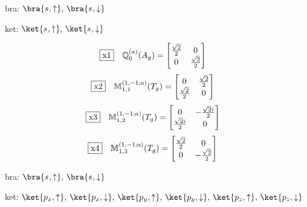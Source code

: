 \documentclass[fleqn,10pt,landscape]{jsarticle}
\begin{document}
\noindent\textbullet\, bra: $\bra{s_{},\uparrow},\, \bra{s_{},\downarrow}$

\noindent\textbullet\, ket: $\ket{s_{},\uparrow},\, \ket{s_{},\downarrow}$

\begin{dmath*}
\fbox{x1}\quad \mathbb{Q}_{0}^{(a)}(A_{g})=\begin{bmatrix} \frac{\sqrt{2}}{2} & 0 \\ 0 & \frac{\sqrt{2}}{2} \end{bmatrix}
\end{dmath*}
\begin{dmath*}
\fbox{x2}\quad \mathbb{M}_{1,1}^{(1,-1;a)}(T_{g})=\begin{bmatrix} 0 & \frac{\sqrt{2}}{2} \\ \frac{\sqrt{2}}{2} & 0 \end{bmatrix}
\end{dmath*}
\begin{dmath*}
\fbox{x3}\quad \mathbb{M}_{1,2}^{(1,-1;a)}(T_{g})=\begin{bmatrix} 0 & - \frac{\sqrt{2} i}{2} \\ \frac{\sqrt{2} i}{2} & 0 \end{bmatrix}
\end{dmath*}
\begin{dmath*}
\fbox{x4}\quad \mathbb{M}_{1,3}^{(1,-1;a)}(T_{g})=\begin{bmatrix} \frac{\sqrt{2}}{2} & 0 \\ 0 & - \frac{\sqrt{2}}{2} \end{bmatrix}
\end{dmath*}
\vspace{5mm}

\noindent\textbullet\, bra: $\bra{s_{},\uparrow},\, \bra{s_{},\downarrow}$

\noindent\textbullet\, ket: $\ket{p_{x},\uparrow},\, \ket{p_{x},\downarrow},\, \ket{p_{y},\uparrow},\, \ket{p_{y},\downarrow},\, \ket{p_{z},\uparrow},\, \ket{p_{z},\downarrow}$
\end{document}
